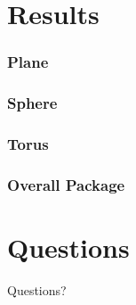 \documentclass{beamer}
\begin{document}
\section{Results}

\begin{frame}

\frametitle{Plane}

\end{frame}


\begin{frame}
	
\frametitle{Sphere}
	
\end{frame}


\begin{frame}
	
\frametitle{Torus}
	
\end{frame}


\begin{frame}
	
\frametitle{Overall Package}
	
\end{frame}

\section{Questions}

\begin{frame}
\Huge{\centerline{Questions?}}
\end{frame}
\end{document}
